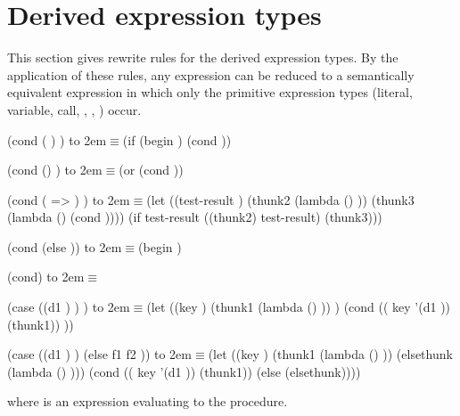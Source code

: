 \section{Derived expression types}
\label{derivedsection}

This section gives rewrite rules for the derived expression types.  By
the application of these rules, any expression can be reduced to a
semantically equivalent expression in which only the primitive
expression types (literal, variable, call, , ,
) occur.


\newcommand{\iet}{\hbox to 2em{\hfil $\equiv$}}  %

\begin{schemenoindent}
(cond ( )
       \dotsfoo)
\iet  (if 
          (begin )
          (cond  \dotsfoo))

(cond ()
       \dotsfoo)
\iet  (or  (cond  \dotsfoo))

(cond ( => )
       \dotsfoo)
\iet  (let ((test-result )
            (thunk2 (lambda () ))
            (thunk3 (lambda () (cond  \dotsfoo))))
        (if test-result
            ((thunk2) test-result)
            (thunk3)))

(cond (else ))
\iet  (begin )

(cond)
\iet  {}

(case  
  ((d1 \dotsfoo) )
  \dotsfoo)
\iet  (let ((key )
            (thunk1 (lambda () ))
            \dotsfoo)
        (cond (( key '(d1 \dotsfoo)) (thunk1))
               \dotsfoo))

(case  
  ((d1 \dotsfoo) )
  \dotsfoo
  (else f1 f2 \dotsfoo))
\iet  (let ((key )
            (thunk1 (lambda () ))
            \dotsfoo
            (elsethunk (lambda () \dotsfoo)))
        (cond (( key '(d1 \dotsfoo)) (thunk1))
               \dotsfoo
              (else (elsethunk))))%
\end{schemenoindent}
where  is an expression evaluating to the  procedure.

